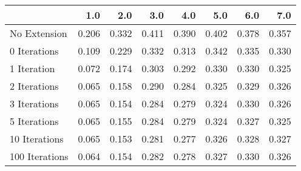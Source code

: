 \begin{tabular}{lrrrrrrr}
\toprule
{} &   1.0 &   2.0 &   3.0 &   4.0 &   5.0 &   6.0 &   7.0 \\
\midrule
No Extension   & 0.206 & 0.332 & 0.411 & 0.390 & 0.402 & 0.378 & 0.357 \\
0 Iterations   & 0.109 & 0.229 & 0.332 & 0.313 & 0.342 & 0.335 & 0.330 \\
1 Iteration    & 0.072 & 0.174 & 0.303 & 0.292 & 0.330 & 0.330 & 0.325 \\
2 Iterations   & 0.065 & 0.158 & 0.290 & 0.284 & 0.325 & 0.329 & 0.326 \\
3 Iterations   & 0.065 & 0.154 & 0.284 & 0.279 & 0.324 & 0.330 & 0.326 \\
5 Iterations   & 0.065 & 0.155 & 0.284 & 0.279 & 0.324 & 0.327 & 0.325 \\
10 Iterations  & 0.065 & 0.153 & 0.281 & 0.277 & 0.326 & 0.328 & 0.327 \\
100 Iterations & 0.064 & 0.154 & 0.282 & 0.278 & 0.327 & 0.330 & 0.326 \\
\bottomrule
\end{tabular}
